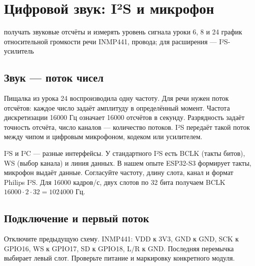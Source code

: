 \section{Цифровой звук: I²S и микрофон}\label{les:i2s}
\lessonintro
  {получать звуковые отсчёты и измерять уровень сигнала}
  {уроки 6, 8 и 24}
  {график относительной громкости речи}
  {INMP441, провода; для расширения --- I²S-усилитель}

\subsection{Звук --- поток чисел}
Пищалка из урока 24 воспроизводила одну частоту. Для речи нужен поток отсчётов: каждое число
задаёт амплитуду в определённый момент. Частота дискретизации 16000 Гц означает 16000 отсчётов
в секунду. Разрядность задаёт точность отсчёта, число каналов --- количество потоков.
I²S передаёт такой поток между чипом и цифровым микрофоном, кодеком или усилителем.

I²S и I²C --- разные интерфейсы. У стандартного I²S есть BCLK (такты битов), WS (выбор канала)
и линия данных. В нашем опыте ESP32-S3 формирует такты, микрофон выдаёт данные.
Согласуйте частоту, длину слота, канал и формат Philips I²S. Для 16000 кадров/с, двух слотов
по 32 бита получаем BCLK $16000\cdot2\cdot32=1024000$ Гц.

\subsection{Подключение и первый поток}
Отключите предыдущую схему. INMP441: VDD к 3V3, GND к GND, SCK к GPIO16,
WS к GPIO17, SD к GPIO18, L/R к GND. Последняя перемычка выбирает левый слот.
Проверьте питание и маркировку конкретного модуля.

